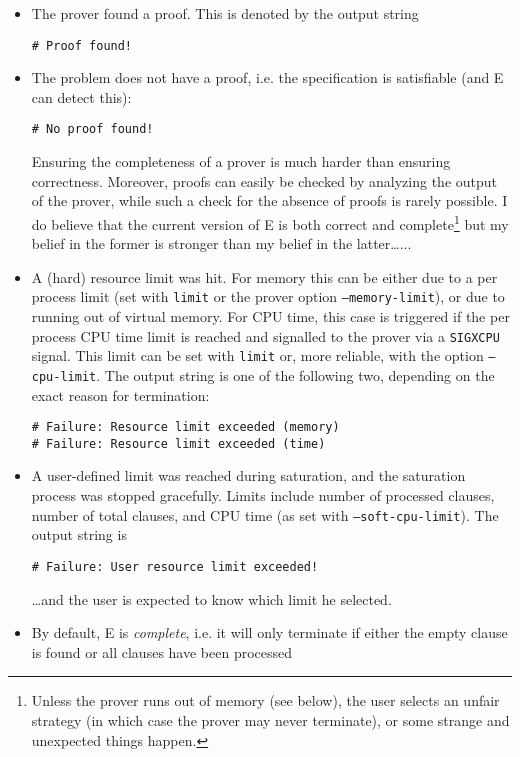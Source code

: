 \documentclass{report}
\begin{document}
\begin{itemize}
\item The prover found a proof. This is denoted by the output string
\begin{verbatim}
# Proof found!
\end{verbatim}
\item The problem does not have a proof, i.e. the specification is
  satisfiable (and E can detect this):
\begin{verbatim}
# No proof found!
\end{verbatim}
  Ensuring the completeness of a prover is much harder than ensuring
  correctness. Moreover, proofs can easily be checked by analyzing the
  output of the prover, while such a check for the absence of proofs
  is rarely possible. I do believe that the current version of E is
  both correct and complete\footnote{Unless the prover runs out of
    memory (see below), the user selects an unfair strategy (in which
    case the prover may never terminate), or some strange and
    unexpected things happen.} but my belief in the former is stronger
  than my belief in the latter\ldots...
\item A (hard) resource limit was hit. For memory this can be either
  due to a per process limit (set with \texttt{limit} or the prover
  option \texttt{--memory-limit}), or due to running out of virtual
  memory. For CPU time, this case is triggered if the per process CPU
  time limit is reached and signalled to the prover via a
  \texttt{SIGXCPU} signal. This limit can be set with \texttt{limit}
  or, more reliable, with the option \texttt{--cpu-limit}. The output
  string is one of the following two, depending on the exact reason
  for termination:
\begin{verbatim}
# Failure: Resource limit exceeded (memory)
# Failure: Resource limit exceeded (time)
\end{verbatim}
\item A user-defined limit was reached during saturation, and the
  saturation process was stopped gracefully. Limits include number of
  processed clauses, number of total clauses, and CPU time (as set
  with \texttt{--soft-cpu-limit}). The output string is
\begin{verbatim}
# Failure: User resource limit exceeded!
\end{verbatim}
  \ldots and the user is expected to know which limit he selected.
\item By default, E is \emph{complete}, i.e. it will only terminate if
  either the empty clause is found or all clauses have been processed

\end{itemize}
\end{document}

